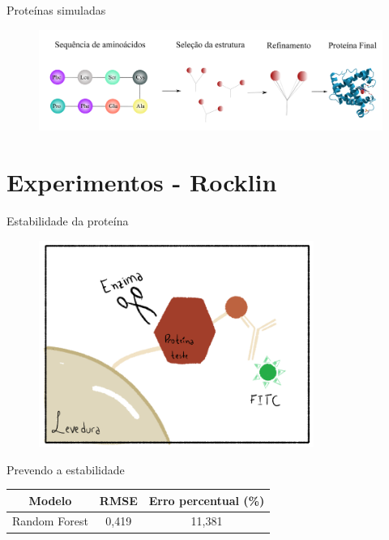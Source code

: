 \documentclass[10pt]{beamer}
\begin{document}
\begin{frame}{Proteínas simuladas}
    \begin{figure}
        \centering
        \includegraphics[width=1.0\textwidth]{images/computationalprotein.pdf}
    \end{figure} 
\end{frame}

\section{Experimentos - Rocklin}

\begin{frame}{Estabilidade da proteína} 
   \begin{figure}
        \centering
        \includegraphics[width=0.8\textwidth]{../images/yeast_cell.png}
    \end{figure} 
\end{frame}

\begin{frame}{Prevendo a estabilidade}
  \begin{table}
      \begin{tabular}{@{}ccc@{}}
      \toprule
      Modelo          & RMSE & Erro percentual (\%) \\ \midrule
      Random Forest & 0,419         & 11,381          \\ \bottomrule
      \end{tabular}
      \label{tab:rocklin}
  \end{table}
\end{frame}
\end{document}
